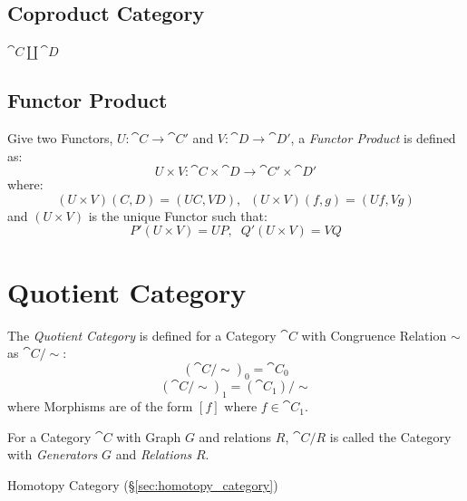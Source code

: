 \subsection{Coproduct Category}\label{sec:coproduct_category}

$\cat{C} \coprod \cat{D}$



\subsection{Functor Product}\label{sec:functor_product}

Give two Functors, $U : \cat{C} \rightarrow \cat{C'}$ and $V :
\cat{D} \rightarrow \cat{D'}$, a \emph{Functor Product} is
defined as:
\[
  U \times V : \cat{C} \times \cat{D}
  \rightarrow \cat{C'} \times \cat{D'}
\]
where:
\[
  (U \times V)(C,D) = (UC,VD), \;\; (U \times V)(f,g) = (Uf,Vg)
\]
and $(U \times V)$ is the unique Functor such that:
\[
  P'(U \times V) = UP, \;\; Q'(U \times V) = VQ
\]



\section{Quotient Category}\label{sec:quotient_category}


The \emph{Quotient Category} is defined for a Category $\cat{C}$
with Congruence Relation $\sim$ as $\cat{C}/\sim$:
\[
  (\cat{C}/\sim)_0 = \cat{C_0}
\]\[
  (\cat{C}/\sim)_1 = (\cat{C_1})/\sim
\]
where Morphisms are of the form $[f]$ where $f \in \cat{C_1}$.

For a Category $\cat{C}$ with Graph $G$ and relations $R$,
$\cat{C}/R$ is called the Category with \emph{Generators} $G$ and
\emph{Relations} $R$.

Homotopy Category (\S\ref{sec:homotopy_category})




